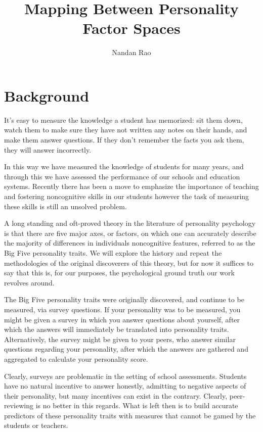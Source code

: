 \documentclass[a4paper,12pt]{article}
\begin{document}
\title{Mapping Between Personality Factor Spaces}

\author{Nandan Rao}

\maketitle

\section{Background}
It's easy to measure the knowledge a student has memorized: sit them down, watch them to make sure they have not written any notes on their hands, and make them answer questions. If they don't remember the facts you ask them, they will answer incorrectly.

In this way we have measured the knowledge of students for many years, and through this we have assessed the performance of our schools and education systems. Recently there has been a move to emphasize the importance of teaching and fostering noncognitive skills in our students however the task of measuring these skills is still an unsolved problem.

A long standing and oft-proved theory in the literature of personality psychology is that there are five major axes, or factors, on which one can accurately describe the majority of differences in individuals noncognitive features, referred to as the Big Five personality traits. We will explore the history and repeat the methodologies of the original discoverers of this theory, but for now it suffices to say that this is, for our purposes, the psychological ground truth our work revolves around.

The Big Five personality traits were originally discovered, and continue to be measured, via survey questions. If your personality was to be measured, you might be given a survey in which you answer questions about yourself, after which the answers will immediately be translated into personality traits. Alternatively, the survey might be given to your peers, who answer similar questions regarding your personality, after which the answers are gathered and aggregated to calculate your personality score.

Clearly, surveys are problematic in the setting of school assessments. Students have no natural incentive to answer honestly, admitting to negative aspects of their personality, but many incentives can exist in the contrary. Clearly, peer-reviewing is no better in this regards. What is left then is to build accurate predictors of these personality traits with measures that cannot be gamed by the students or teachers.
\end{document}
